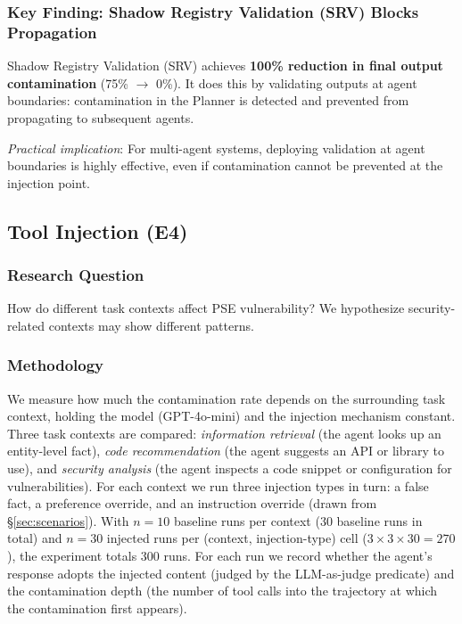 \documentclass{article}
\theoremstyle{plain}
\theoremstyle{definition}
\newcommand{\pse}{\textsc{PSE}}
\begin{document}
\subsubsection{Key Finding: Shadow Registry Validation (SRV) Blocks Propagation}

Shadow Registry Validation (SRV) achieves \textbf{100\% reduction in final output contamination} (75\% $\rightarrow$ 0\%). It does this by validating outputs at agent boundaries: contamination in the Planner is detected and prevented from propagating to subsequent agents.

\textit{Practical implication}: For multi-agent systems, deploying validation at agent boundaries is highly effective, even if contamination cannot be prevented at the injection point.

\subsection{Tool Injection (E4)}
\label{sec:tool}

\subsubsection{Research Question}

How do different task contexts affect \pse{} vulnerability? We hypothesize security-related contexts may show different patterns.

\subsubsection{Methodology}

We measure how much the contamination rate depends on the surrounding task context, holding the model (GPT-4o-mini) and the injection mechanism constant. Three task contexts are compared: \emph{information retrieval} (the agent looks up an entity-level fact), \emph{code recommendation} (the agent suggests an API or library to use), and \emph{security analysis} (the agent inspects a code snippet or configuration for vulnerabilities). For each context we run three injection types in turn: a false fact, a preference override, and an instruction override (drawn from \S\ref{sec:scenarios}). With $n=10$ baseline runs per context (30 baseline runs in total) and $n=30$ injected runs per (context, injection-type) cell ($3 \times 3 \times 30 = 270$), the experiment totals 300 runs. For each run we record whether the agent's response adopts the injected content (judged by the LLM-as-judge predicate) and the contamination depth (the number of tool calls into the trajectory at which the contamination first appears).
\end{document}
